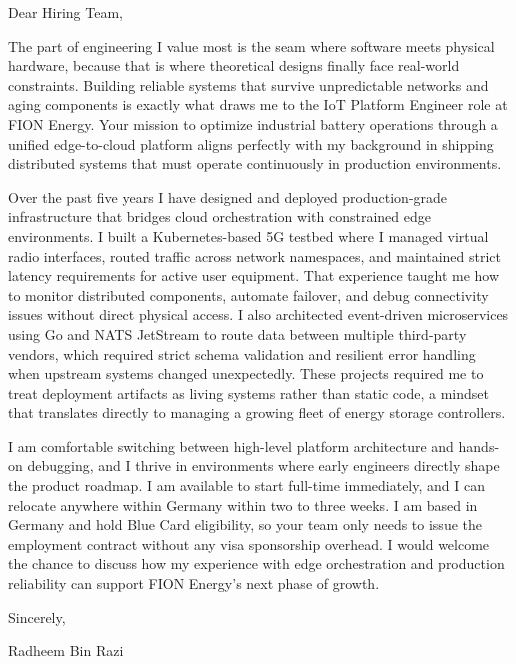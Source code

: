 \documentclass[11pt,a4paper]{coverletter}
\begin{document}

\opening{Dear Hiring Team,}

The part of engineering I value most is the seam where software meets physical hardware, because that is where theoretical designs finally face real-world constraints. Building reliable systems that survive unpredictable networks and aging components is exactly what draws me to the IoT Platform Engineer role at FION Energy. Your mission to optimize industrial battery operations through a unified edge-to-cloud platform aligns perfectly with my background in shipping distributed systems that must operate continuously in production environments.

Over the past five years I have designed and deployed production-grade infrastructure that bridges cloud orchestration with constrained edge environments. I built a Kubernetes-based 5G testbed where I managed virtual radio interfaces, routed traffic across network namespaces, and maintained strict latency requirements for active user equipment. That experience taught me how to monitor distributed components, automate failover, and debug connectivity issues without direct physical access. I also architected event-driven microservices using Go and NATS JetStream to route data between multiple third-party vendors, which required strict schema validation and resilient error handling when upstream systems changed unexpectedly. These projects required me to treat deployment artifacts as living systems rather than static code, a mindset that translates directly to managing a growing fleet of energy storage controllers.

I am comfortable switching between high-level platform architecture and hands-on debugging, and I thrive in environments where early engineers directly shape the product roadmap. I am available to start full-time immediately, and I can relocate anywhere within Germany within two to three weeks. I am based in Germany and hold Blue Card eligibility, so your team only needs to issue the employment contract without any visa sponsorship overhead. I would welcome the chance to discuss how my experience with edge orchestration and production reliability can support FION Energy’s next phase of growth.

\closing{Sincerely,}{Radheem Bin Razi}

\clearpage
{}

\end{document}
